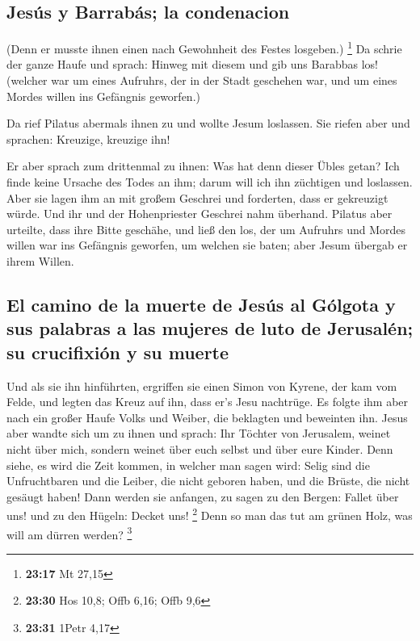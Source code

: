 \hypertarget{jesuxfas-y-barrabuxe1s-la-condenacion}{%
\subsection{Jesús y Barrabás; la
condenacion}\label{jesuxfas-y-barrabuxe1s-la-condenacion}}

 (Denn er musste ihnen einen nach Gewohnheit des Festes
losgeben.) \footnote{\textbf{23:17} Mt 27,15}  Da schrie
der ganze Haufe und sprach: Hinweg mit diesem und gib uns Barabbas los!
 (welcher war um eines Aufruhrs, der in der Stadt
geschehen war, und um eines Mordes willen ins Gefängnis geworfen.)

 Da rief Pilatus abermals ihnen zu und wollte Jesum
loslassen.  Sie riefen aber und sprachen: Kreuzige,
kreuzige ihn!

 Er aber sprach zum drittenmal zu ihnen: Was hat denn
dieser Übles getan? Ich finde keine Ursache des Todes an ihm; darum will
ich ihn züchtigen und loslassen.  Aber sie lagen ihm an
mit großem Geschrei und forderten, dass er gekreuzigt würde. Und ihr und
der Hohenpriester Geschrei nahm überhand.  Pilatus aber
urteilte, dass ihre Bitte geschähe,  und ließ den los,
der um Aufruhrs und Mordes willen war ins Gefängnis geworfen, um welchen
sie baten; aber Jesum übergab er ihrem Willen.

\hypertarget{el-camino-de-la-muerte-de-jesuxfas-al-guxf3lgota-y-sus-palabras-a-las-mujeres-de-luto-de-jerusaluxe9n-su-crucifixiuxf3n-y-su-muerte}{%
\subsection{El camino de la muerte de Jesús al Gólgota y sus palabras a
las mujeres de luto de Jerusalén; su crucifixión y su
muerte}\label{el-camino-de-la-muerte-de-jesuxfas-al-guxf3lgota-y-sus-palabras-a-las-mujeres-de-luto-de-jerusaluxe9n-su-crucifixiuxf3n-y-su-muerte}}

 Und als sie ihn hinführten, ergriffen sie einen Simon
von Kyrene, der kam vom Felde, und legten das Kreuz auf ihn, dass er's
Jesu nachtrüge.  Es folgte ihm aber nach ein großer Haufe
Volks und Weiber, die beklagten und beweinten ihn.  Jesus
aber wandte sich um zu ihnen und sprach: Ihr Töchter von Jerusalem,
weinet nicht über mich, sondern weinet über euch selbst und über eure
Kinder.  Denn siehe, es wird die Zeit kommen, in welcher
man sagen wird: Selig sind die Unfruchtbaren und die Leiber, die nicht
geboren haben, und die Brüste, die nicht gesäugt haben! 
Dann werden sie anfangen, zu sagen zu den Bergen: Fallet über uns! und
zu den Hügeln: Decket uns! \footnote{\textbf{23:30} Hos 10,8; Offb 6,16;
  Offb 9,6}  Denn so man das tut am grünen Holz, was will
am dürren werden? \footnote{\textbf{23:31} 1Petr 4,17}

